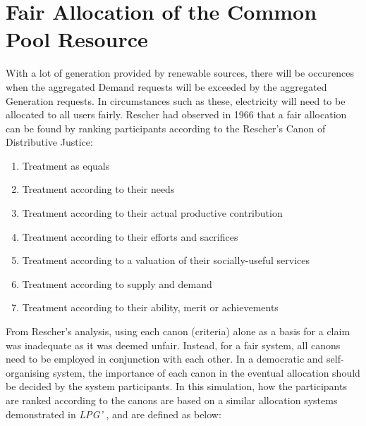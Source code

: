 \section*{Fair Allocation of the Common Pool Resource}
With a lot of generation provided by renewable sources, there will be occurences when the aggregated Demand requests will be exceeded by the aggregated Generation requests. In circumstances such as these, electricity will need to be allocated to all users fairly. {\color{red} Rescher had observed in 1966 that a fair allocation can be found by ranking participants according to the Rescher's Canon of Distributive Justice:}

\begin{enumerate} \itemsep1pt \parskip0pt 
	\item Treatment as equals
	\item Treatment according to their needs
	\item Treatment according to their actual productive contribution
	\item Treatment according to their efforts and sacrifices
	\item Treatment according to a valuation of their socially-useful services
	\item Treatment according to supply and demand
	\item Treatment according to their ability, merit or achievements
\end{enumerate}


From Rescher's analysis, using each canon (criteria) alone as a basis for a claim was inadequate as it was deemed unfair. Instead, for a fair system, all canons need to be employed in conjunction with each other. In a democratic and self-organising system, the importance of each canon in the eventual allocation should be decided by the system participants. In this simulation, how the participants are ranked according to the canons are based on a similar allocation systems demonstrated in \textit{LPG'}\cite{PittSASO2012} , and are defined as below:

